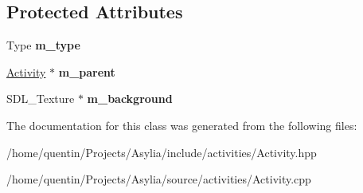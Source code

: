 \subsection*{Protected Attributes}
\begin{DoxyCompactItemize}
\item 
\hypertarget{classActivity_a97a995e281ea0edca895d8d0a2e38402}{Type {\bfseries m\-\_\-type}}\label{classActivity_a97a995e281ea0edca895d8d0a2e38402}

\item 
\hypertarget{classActivity_a1296633231a9db265ee50c38ff775eaf}{\hyperlink{classActivity}{Activity} $\ast$ {\bfseries m\-\_\-parent}}\label{classActivity_a1296633231a9db265ee50c38ff775eaf}

\item 
\hypertarget{classActivity_a0583a6d6a451ff54d95a2c058eca992f}{S\-D\-L\-\_\-\-Texture $\ast$ {\bfseries m\-\_\-background}}\label{classActivity_a0583a6d6a451ff54d95a2c058eca992f}

\end{DoxyCompactItemize}


The documentation for this class was generated from the following files\-:\begin{DoxyCompactItemize}
\item 
/home/quentin/\-Projects/\-Asylia/include/activities/Activity.\-hpp\item 
/home/quentin/\-Projects/\-Asylia/source/activities/Activity.\-cpp\end{DoxyCompactItemize}
